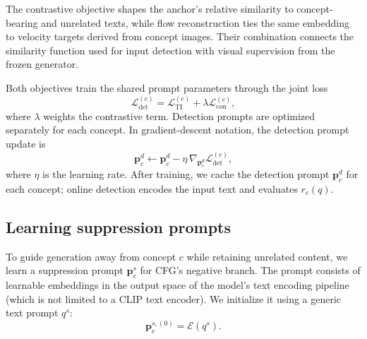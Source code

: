 The contrastive objective shapes the anchor's relative similarity to concept-bearing and unrelated texts, 
while flow reconstruction ties the same embedding to velocity targets derived from concept images. 
Their combination connects the similarity function used for input detection with visual supervision from the frozen generator.

Both objectives train the shared prompt parameters through the joint loss
\begin{equation}
    \mathcal L_{\mathrm{det}}^{(c)}
    =\mathcal L_{\mathrm{TI}}^{(c)}
    +\lambda\mathcal L_{\mathrm{con}}^{(c)},
    \label{eq:detection_objective}
\end{equation}
where $\lambda$ weights the contrastive term.
Detection prompts are optimized separately for each concept.
In gradient-descent notation, the detection prompt update is
\begin{equation}
    \mathbf p_c^d \leftarrow \mathbf p_c^d
    -\eta\,\nabla_{\mathbf p_c^d}\mathcal L_{\mathrm{det}}^{(c)},
    \label{eq:detection_update}
\end{equation}
where $\eta$ is the learning rate.
After training, we cache the detection prompt $\mathbf p_c^d$ for each concept; online detection encodes the input text and evaluates $r_c(q)$.

\subsection{Learning suppression prompts}
\label{sec:suppression_prompt}

To guide generation away from concept $c$ while retaining unrelated content, we learn a suppression prompt $\mathbf p_c^s$ for CFG's negative branch.
The prompt consists of learnable embeddings in the output space of the model's text encoding pipeline (which is not limited to a CLIP text encoder).
We initialize it using a generic text prompt $q^s$:
\begin{equation}
    \mathbf p_c^{s,(0)}=\mathcal E(q^s).
    \label{eq:suppression_initialization}
\end{equation}


